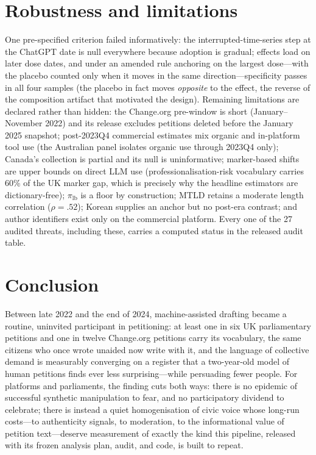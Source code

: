 \documentclass[10pt,twocolumn]{article}
\begin{document}
\section{Robustness and limitations}
One pre-specified criterion failed informatively: the interrupted-time-series step at the ChatGPT date is null everywhere because adoption is gradual; effects load on later dose dates, and under an amended rule anchoring on the largest dose---with the placebo counted only when it moves in the same direction---specificity passes in all four samples (the placebo in fact moves \emph{opposite} to the effect, the reverse of the composition artifact that motivated the design). Remaining limitations are declared rather than hidden: the Change.org pre-window is short (January--November 2022) and its release excludes petitions deleted before the January 2025 snapshot; post-2023Q4 commercial estimates mix organic and in-platform tool use (the Australian panel isolates organic use through 2023Q4 only); Canada's collection is partial and its null is uninformative; marker-based shifts are upper bounds on direct LLM use (professionalisation-risk vocabulary carries 60\% of the UK marker gap, which is precisely why the headline estimators are dictionary-free); $\pi_{\mathrm{lb}}$ is a floor by construction; MTLD retains a moderate length correlation ($\rho=.52$); Korean supplies an anchor but no post-era contrast; and author identifiers exist only on the commercial platform. Every one of the 27 audited threats, including these, carries a computed status in the released audit table.

\section{Conclusion}
Between late 2022 and the end of 2024, machine-assisted drafting became a routine, uninvited participant in petitioning: at least one in six UK parliamentary petitions and one in twelve Change.org petitions carry its vocabulary, the same citizens who once wrote unaided now write with it, and the language of collective demand is measurably converging on a register that a two-year-old model of human petitions finds ever less surprising---while persuading fewer people. For platforms and parliaments, the finding cuts both ways: there is no epidemic of successful synthetic manipulation to fear, and no participatory dividend to celebrate; there is instead a quiet homogenisation of civic voice whose long-run costs---to authenticity signals, to moderation, to the informational value of petition text---deserve measurement of exactly the kind this pipeline, released with its frozen analysis plan, audit, and code, is built to repeat.
\end{document}
